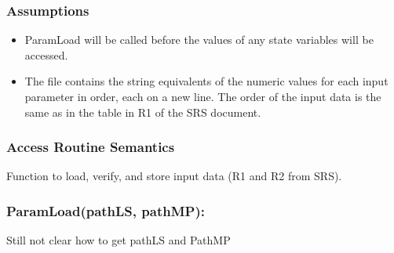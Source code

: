 \documentclass[12pt, titlepage]{article}
\begin{document}
\subsubsection{Assumptions}
\begin{itemize}
	
	\item ParamLoad will be called before the values of any state variables will be accessed.
	
	\item The file contains the string equivalents of the numeric values for each input parameter
	in order, each on a new line. The order of the input data is the same as in the table in R1 of the SRS document. 
	
\end{itemize}

\subsubsection{Access Routine Semantics}

Function to load, verify, and store input data (R1 and R2 from SRS).

\subsubsection*{ParamLoad(pathLS, pathMP):}
Still not clear how to get pathLS and PathMP
\end{document}
